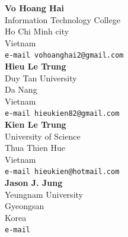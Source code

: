 \documentclass[10pt,leqno,twoside]{article}
\begin{document}
\noindent\textbf{Vo Hoang Hai}\\
Information Technology College\\
Ho Chi Minh city\\
Vietnam\\
{\tt e-mail vohoanghai2@gmail.com}\\

\noindent\textbf{Hieu Le Trung}\\
Duy Tan University\\
Da Nang\\
Vietnam\\
{\tt e-mail hieukien82@gmail.com}\\

\noindent\textbf{Kien Le Trung}\\
University of Science\\
Thua Thien Hue\\
Vietnam\\
{\tt e-mail hieukien@hotmail.com}\\

\noindent\textbf{Jason J. Jung}\\
Yeungnam University\\
Gyeongsan\\
Korea\\
{\tt e-mail }
\end{document}
